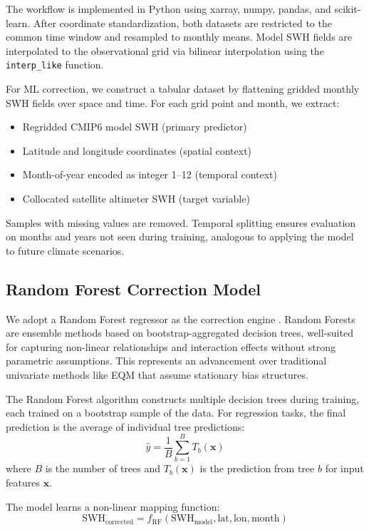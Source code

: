 \documentclass[conference]{IEEEtran}
\begin{document}
The workflow is implemented in Python using xarray, numpy, pandas, and scikit-learn. After coordinate standardization, both datasets are restricted to the common time window and resampled to monthly means. Model SWH fields are interpolated to the observational grid via bilinear interpolation using the \texttt{interp\_like} function.

For ML correction, we construct a tabular dataset by flattening gridded monthly SWH fields over space and time. For each grid point and month, we extract:
\begin{itemize}
    \item Regridded CMIP6 model SWH (primary predictor)
    \item Latitude and longitude coordinates (spatial context)
    \item Month-of-year encoded as integer 1--12 (temporal context)
    \item Collocated satellite altimeter SWH (target variable)
\end{itemize}

Samples with missing values are removed. Temporal splitting ensures evaluation on months and years not seen during training, analogous to applying the model to future climate scenarios.

\subsection{Random Forest Correction Model}

We adopt a Random Forest regressor as the correction engine \cite{breiman2001}. Random Forests are ensemble methods based on bootstrap-aggregated decision trees, well-suited for capturing non-linear relationships and interaction effects without strong parametric assumptions. This represents an advancement over traditional univariate methods like EQM that assume stationary bias structures.

The Random Forest algorithm constructs multiple decision trees during training, each trained on a bootstrap sample of the data. For regression tasks, the final prediction is the average of individual tree predictions:
\begin{equation}
\hat{y} = \frac{1}{B}\sum_{b=1}^{B} T_b(\mathbf{x})
\end{equation}
where $B$ is the number of trees and $T_b(\mathbf{x})$ is the prediction from tree $b$ for input features $\mathbf{x}$.

The model learns a non-linear mapping function:
\begin{equation}
\text{SWH}_{\text{corrected}} = f_{\text{RF}}(\text{SWH}_{\text{model}}, \text{lat}, \text{lon}, \text{month})
\end{equation}
\end{document}
